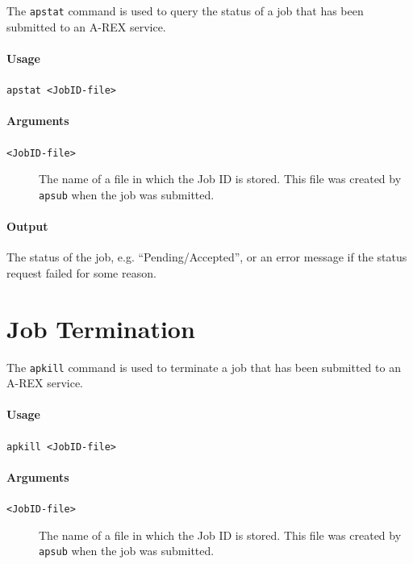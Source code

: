 \documentclass{article}                            %
\begin{document}
The \verb#apstat# command is used to query the status of a job that
has been submitted to an A-REX service.

\begin{shaded}
\paragraph{Usage} \verb:apstat <JobID-file>:
\end{shaded}

\paragraph{Arguments}
\begin{description}
\item[\texttt{<JobID-file>}] The name of a file in which the
Job ID is stored. This file was created by \verb:apsub: when the job
was submitted.
\end{description}

\paragraph{Output} The status of the job, e.g. ``Pending/Accepted'',
or an error message if the status request failed for some reason.


\section{Job Termination}
\label{sec:apkill}

The \verb#apkill# command is used to terminate a job that has been
submitted to an A-REX service.

\begin{shaded}
\paragraph{Usage} \verb:apkill <JobID-file>:
\end{shaded}

\paragraph{Arguments}
\begin{description}
\item[\texttt{<JobID-file>}] The name of a file in which the
Job ID is stored. This file was created by \verb:apsub: when the job
was submitted.
\end{description}
\end{document}
